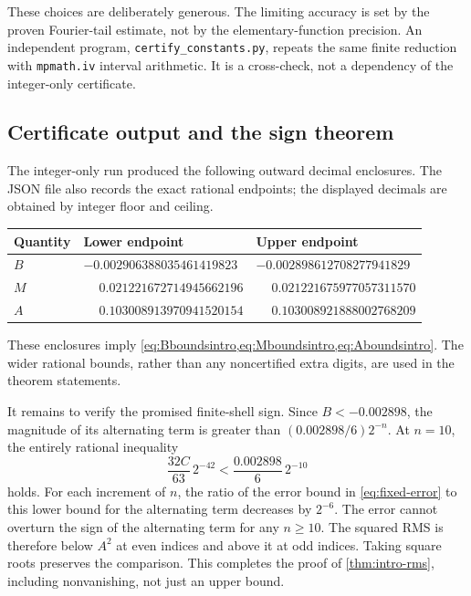 \documentclass[11pt,a4paper]{article}
\theoremstyle{definition}
\theoremstyle{remark}
\numberwithin{equation}{section}
\begin{document}
These choices are deliberately generous. The limiting accuracy is set by
the proven Fourier-tail estimate, not by the elementary-function precision.
An independent program, \texttt{certify\_constants.py}, repeats the same
finite reduction with \texttt{mpmath.iv} interval arithmetic. It is a
cross-check, not a dependency of the integer-only certificate.

\subsection{Certificate output and the sign theorem}
The integer-only run produced the following outward decimal enclosures.
The JSON file also records the exact rational endpoints; the displayed
decimals are obtained by integer floor and ceiling.
\begin{center}
\begin{tabular}{@{}lll@{}}
\toprule
Quantity & Lower endpoint & Upper endpoint\\
\midrule
$B$ & $-0.002906388035461419823$ & $-0.002898612708277941829$\\
$M$ & $\phantom{-}0.021221672714945662196$ & $\phantom{-}0.021221675977057311570$\\
$A$ & $\phantom{-}0.103008913970941520154$ & $\phantom{-}0.103008921888002768209$\\
\bottomrule
\end{tabular}
\end{center}
These enclosures imply \cref{eq:Bboundsintro,eq:Mboundsintro,eq:Aboundsintro}.
The wider rational bounds, rather than any noncertified extra digits, are
used in the theorem statements.

It remains to verify the promised finite-shell sign. Since $B<-0.002898$,
the magnitude of its alternating term is greater than
$(0.002898/6)2^{-n}$. At $n=10$, the entirely rational inequality
\begin{equation}
 \frac{32C}{63}\,2^{-42}
 <\frac{0.002898}{6}\,2^{-10}
 \label{eq:signcheck}
\end{equation}
holds. For each increment of $n$, the ratio of the error bound in
\cref{eq:fixed-error} to this lower bound for the alternating term decreases
by $2^{-6}$. The error cannot overturn the sign of the alternating term for any $n\ge10$.
The squared RMS is therefore below $A^2$ at even indices and above it at odd
indices. Taking square roots preserves the comparison. This completes the
proof of \cref{thm:intro-rms}, including nonvanishing, not just an upper bound.
\end{document}
